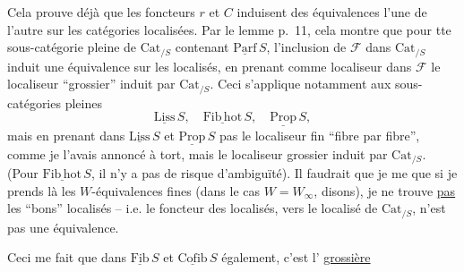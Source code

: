 
Cela prouve déjà que les foncteurs $r$ et $C$ induisent des équivalences  l'une de l'autre sur les catégories localisées. Par le lemme p.~11, cela montre que pour tte sous-catégorie pleine  de $\mathrm{Cat}_{/S}$ contenant $\underline{\mathrm{Parf}}\,S$, l'inclusion de $\mathcal F$ dans $\mathrm{Cat}_{/S}$ induit une équivalence sur les localisés, en prenant comme localiseur dans $\mathcal F$ le localiseur ``grossier'' induit par $\mathrm{Cat}_{/S}$. Ceci s'applique notamment aux sous-catégories pleines
\[
\underline{\mathrm{Liss}}\,S,\quad\underline{\mathrm{Fib\,hot}}\,S,\quad\underline{\mathrm{Prop}}\,S,
\]
\leavevmode\llap{\smash{\rule[-2.3\baselineskip]{.4pt}{3\baselineskip}}\quad}mais en prenant dans $\underline{\mathrm{Liss}}\,S$ et $\underline{\mathrm{Prop}}\,S$  pas le localiseur fin ``fibre par fibre'', comme je l'avais annoncé à tort, mais le localiseur grossier induit par $\mathrm{Cat}_{/S}$. (Pour $\underline{\mathrm{Fib\,hot}}\,S$, il n'y a pas de risque d'ambiguïté). Il faudrait que je me  que si je prends là les $W$-équivalences fines (dans le cas $W=W_{\infty}$, disons), je ne trouve \uline{pas} les ``bons'' localisés -- i.e. le foncteur des localisés, vers le localisé de $\mathrm{Cat}_{/S}$, n'est pas une équivalence.

Ceci me fait  que dans $\underline{\mathrm{Fib}}\,S$ et $\underline{\mathrm{Cofib}}\,S$ également, c'est l' \uline{grossière}

